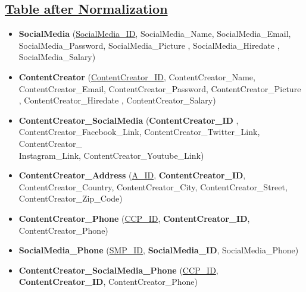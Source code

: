 \subsection*{\underline{Table after Normalization}}
\begin{itemize}
    \item \textbf{SocialMedia} (\underline{SocialMedia\_ID}, SocialMedia\_Name, SocialMedia\_Email, SocialMedia\_Password, SocialMedia\_Picture , SocialMedia\_Hiredate , SocialMedia\_Salary)
    \item \textbf{ContentCreator} (\underline{ContentCreator\_ID}, ContentCreator\_Name, ContentCreator\_Email, ContentCreator\_Password, ContentCreator\_Picture , ContentCreator\_Hiredate , ContentCreator\_Salary)
    \item \textbf{ContentCreator\_SocialMedia} (\textbf{ContentCreator\_ID} , ContentCreator\_Facebook\_Link, ContentCreator\_Twitter\_Link, ContentCreator\_\\Instagram\_Link, ContentCreator\_Youtube\_Link)
    \item \textbf{ContentCreator\_Address} (\underline{A\_ID}, \textbf{ContentCreator\_ID}, ContentCreator\_Country, ContentCreator\_City, ContentCreator\_Street, ContentCreator\_Zip\_Code)
    \item \textbf{ContentCreator\_Phone} (\underline{CCP\_ID}, \textbf{ContentCreator\_ID}, ContentCreator\_Phone)
    \item \textbf{SocialMedia\_Phone} (\underline{SMP\_ID}, \textbf{SocialMedia\_ID}, SocialMedia\_Phone)
    \item \textbf{ContentCreator\_SocialMedia\_Phone} (\underline{CCP\_ID}, \textbf{ContentCreator\_ID}, ContentCreator\_Phone)

\end{itemize}

\clearpage